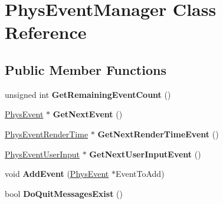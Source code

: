 \hypertarget{classPhysEventManager}{
\section{PhysEventManager Class Reference}
\label{d5/dd7/classPhysEventManager}
}
\subsection*{Public Member Functions}
\begin{DoxyCompactItemize}
\item 
\hypertarget{classPhysEventManager_ab14d238e7abe9919be8e2d9eef388b64}{
unsigned int {\bfseries GetRemainingEventCount} ()}
\label{d5/dd7/classPhysEventManager_ab14d238e7abe9919be8e2d9eef388b64}

\item 
\hypertarget{classPhysEventManager_a6de94bc6c23dcbd7e15785cadee2e80b}{
\hyperlink{classPhysEvent}{PhysEvent} $\ast$ {\bfseries GetNextEvent} ()}
\label{d5/dd7/classPhysEventManager_a6de94bc6c23dcbd7e15785cadee2e80b}

\item 
\hypertarget{classPhysEventManager_a1f2d0506ce816176913e5bdfaa9fd724}{
\hyperlink{classPhysEventRenderTime}{PhysEventRenderTime} $\ast$ {\bfseries GetNextRenderTimeEvent} ()}
\label{d5/dd7/classPhysEventManager_a1f2d0506ce816176913e5bdfaa9fd724}

\item 
\hypertarget{classPhysEventManager_a4874a9b1138d2351bf28e527a66c02b8}{
\hyperlink{classPhysEventUserInput}{PhysEventUserInput} $\ast$ {\bfseries GetNextUserInputEvent} ()}
\label{d5/dd7/classPhysEventManager_a4874a9b1138d2351bf28e527a66c02b8}

\item 
\hypertarget{classPhysEventManager_a7c9bb46b17f6d9245817a402dc6a2f6f}{
void {\bfseries AddEvent} (\hyperlink{classPhysEvent}{PhysEvent} $\ast$EventToAdd)}
\label{d5/dd7/classPhysEventManager_a7c9bb46b17f6d9245817a402dc6a2f6f}

\item 
\hypertarget{classPhysEventManager_a77b22f706d22914602982cbcaf05bba9}{
bool {\bfseries DoQuitMessagesExist} ()}
\label{d5/dd7/classPhysEventManager_a77b22f706d22914602982cbcaf05bba9}

\end{DoxyCompactItemize}
